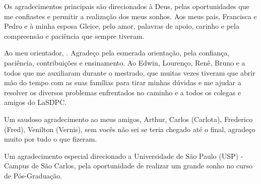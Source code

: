 Os agradecimentos principais são direcionados à Deus, pelas oportunidades que me confiastes e permitir a realização dos meus sonhos. Aos meus pais, Francisca e Pedro e à minha esposa Gleice, pelo amor, palavras de apoio, carinho e pela compreensão e paciência que sempre tiveram. 

Ao meu orientador, \imprimirorientador. Agradeço pela esmerada orientação, pela confiança, paciência, contribuições e ensinamento. Ao Edwin, Lourenço, Renê, Bruno e a todos que me auxiliaram durante o mestrado, que muitas vezes tiveram que abrir mão do tempo com as suas famílias para tirar minhas dúvidas e me ajudar a resolver os diversos problemas enfrentados no caminho e a todos os colegas e amigos do LaSDPC.

Um saudoso agradecimento ao meus amigos, Arthur, Carlos (Carlota), Frederico (Fred), Venilton (Vernis), sem vocês não sei se teria chegado até o final, agradeço muito por tudo o que fizeram.

Um agradecimento especial direcionado a Universidade de São Paulo (USP) - Campus de São Carlos, pela oportunidade de realizar um grande sonho no curso de Pós-Graduação.

